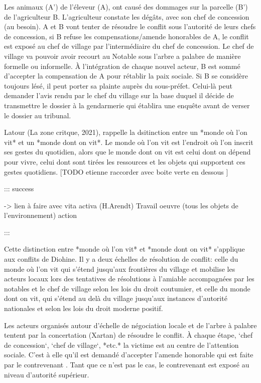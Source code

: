Les animaux (A') de l'éleveur (A), ont causé des dommages sur la parcelle (B') de l'agriculteur B. L'agriculteur constate les dégâts, avec son chef de concession (au besoin). A et B vont tenter de résoudre le conflit sous l'autorité de leurs chefs de concession, si B refuse les compensations/amende honorables de A, le conflit est exposé au chef de village par l'intermédiaire du chef de concession. Le chef de village va pouvoir avoir recourt au Notable sous l'arbre a palabre de manière formelle ou informelle. À l'intégration de chaque nouvel acteur, B est sommé d'accepter la compensation de A pour rétablir la paix sociale. Si B se considère toujours lésé, il peut porter sa plainte auprès du sous-préfet. Celui-là peut demander l'avis rendu par le chef du village sur la base duquel il décide de transmettre le dossier à la gendarmerie qui établira une enquête avant de verser le dossier au tribunal. 

Latour (La zone critque, 2021), rappelle la dsitinction entre  un *monde où l'on vit* et un *monde dont on vit*. Le monde où l'on vit  est l'endroit où l'on inscrit ses gestes du quotidien, alors que le monde dont on vit est  celui dont on dépend pour vivre, celui dont sont tirées les ressources et les objets qui supportent ces gestes quotidiens. [TODO etienne raccorder avec boite verte en dessous ]

::: success

 -> lien à faire avec vita activa (H.Arendt)
Travail 
oeuvre (tous les objets de l'environnement) 
action 

:::



Cette distinction entre *monde où l'on vit* et *monde dont on vit* s'applique aux conflits de Diohine. Il y a deux échelles de résolution de conflit:  celle du monde où l'on vit qui s'étend jusqu'aux frontières du village et mobilise les acteurs locaux lors des tentatives de résolutions à l'amiable accompagnées par les notables et le chef de village selon les lois du droit coutumier,  et celle du monde dont on vit, qui s'étend au delà du village jusqu'aux instances d'autorité nationales et selon les lois du droit moderne positif. 

Les acteurs organisés autour d’échelle de négociation locale et de l'arbre à palabre tentent par la concertation (Xartan) de résoudre le conflit. À chaque étape, `chef de concession`, `chef de village`, *etc.* la victime est au centre de l'attention sociale. C'est à elle qu'il est demandé d'accepter l'amende honorable qui est faite par le contrevenant
. Tant que ce n'est pas le cas, le contrevenant est exposé au niveau d'autorité supérieur.

